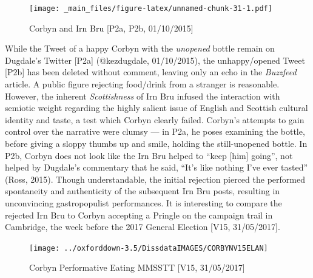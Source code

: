 \documentclass[a4paper, nobind]{templates/ociamthesis}
\begin{document}
\begin{figure}
\centering
\texttt{[image: \_main\_files/figure-latex/unnamed-chunk-31-1.pdf]}
\caption{\label{fig:unnamed-chunk-31}Corbyn and Irn Bru {[}P2a, P2b, 01/10/2015{]}}
\end{figure}

While the Tweet of a happy Corbyn with the \emph{unopened} bottle remain on Dugdale's Twitter {[}P2a{]} (@kezdugdale, 01/10/2015), the unhappy/opened Tweet {[}P2b{]} has been deleted without comment, leaving only an echo in the \emph{Buzzfeed} article. A public figure rejecting food/drink from a stranger is reasonable. However, the inherent \emph{Scottishness} of Irn Bru infused the interaction with semiotic weight regarding the highly salient issue of English and Scottish cultural identity and taste, a test which Corbyn clearly failed. Corbyn's attempts to gain control over the narrative were clumsy --- in P2a, he poses examining the bottle, before giving a sloppy thumbs up and smile, holding the still-unopened bottle. In P2b, Corbyn does not look like the Irn Bru helped to ``keep {[}him{]} going'', not helped by Dugdale's commentary that he said, ``It's like nothing I've ever tasted'' (Ross, 2015). Though understandable, the initial rejection pierced the performed spontaneity and authenticity of the subsequent Irn Bru posts, resulting in unconvincing gastropopulist performances. It is interesting to compare the rejected Irn Bru to Corbyn accepting a Pringle on the campaign trail in Cambridge, the week before the 2017 General Election {[}V15, 31/05/2017{]}.

\begin{figure}
\texttt{[image: ../oxforddown-3.5/DissdataIMAGES/CORBYNV15ELAN]} \caption{Corbyn Performative Eating MMSSTT [V15, 31/05/2017]}\label{fig:unnamed-chunk-32}
\end{figure}
\end{document}
